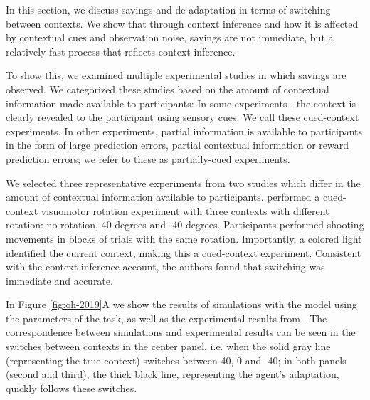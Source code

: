 \documentclass[a4paper,doc,floatsintext,natbib]{apa6}
\def \fref #1{Figure \ref{#1}}     %
\begin{document}
In this section, we discuss savings and de-adaptation in terms of switching between contexts. We show that through context inference and how it is affected by contextual cues and observation noise, savings are not immediate, but a relatively fast process that reflects context inference.

To show this, we examined multiple experimental studies in which savings are observed. We categorized these studies based on the amount of contextual information made available to participants: In some experiments \citep[e.g.][]{Kim_Neural_2015,Lee_Dual_2009}, the context is clearly revealed to the participant using sensory cues. We call these cued-context experiments. In other experiments, partial information is available to participants \citep[e.g.][]{Davidson_Scaling_2004,Zarahn_Explaining_2008} in the form of large prediction errors, partial contextual information or reward prediction errors; we refer to these as partially-cued experiments.

We selected three representative experiments from two studies \citep{Kim_Neural_2015,Oh_Minimizing_2019} which differ in the amount of contextual information available to participants. \cite{Kim_Neural_2015} performed a cued-context visuomotor rotation experiment with three contexts with different rotation: no rotation, 40 degrees and -40 degrees. Participants performed shooting movements in blocks of trials with the same rotation. Importantly, a colored light identified the current context, making this a cued-context experiment. Consistent with the context-inference account, the authors found that switching was immediate and accurate.

In \fref{fig:oh-2019}A we show the results of simulations with the model using the parameters of the task, as well as the experimental results from \cite{Kim_Neural_2015}. The correspondence between simulations and experimental results can be seen in the switches between contexts in the center panel, i.e. when the solid gray line (representing the true context) switches between 40, 0 and -40; in both panels (second and third), the thick black line, representing the agent's adaptation, quickly follows these switches.
\end{document}
